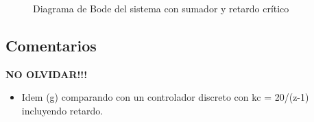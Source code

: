\begin{figure}[h]
  \centering
  
  \caption{Diagrama de Bode del sistema con sumador y retardo crítico}
  \label{fig:bode-h3}
\end{figure}


\FloatBarrier
\subsection{Comentarios}

\textbf{NO OLVIDAR!!!}


\begin{itemize}
  \item Idem (g) comparando con un controlador discreto con kc = 20/(z-1) incluyendo retardo.
\end{itemize}

